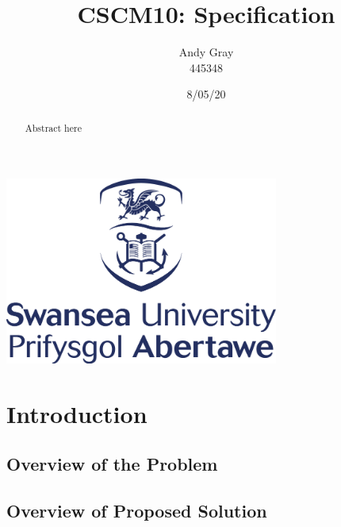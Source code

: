 \documentclass[a4paper,10pt]{article}
\begin{document}
\title{\textbf{CSCM10: Specification}}
\date{8/05/20}
\author{Andy Gray\\445348}




\maketitle
\begin{center}
\item\includegraphics[width=9cm]{swansea.png}
\end{center}

\thispagestyle{empty}
\newpage
{}

\begin{abstract}
	Abstract here 
\end{abstract}

\section{Introduction}

\small 

\subsection{Overview of the Problem}

\subsection{Overview of Proposed Solution}
\end{document}

